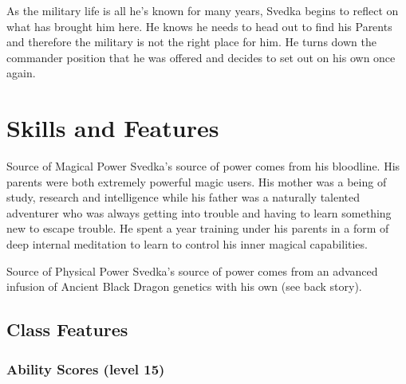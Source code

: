 \documentclass[letterpaper,10pt,twoside,twocolumn,openany]{book}
\begin{document}
As the military life is all he's known for many years, Svedka begins to reflect on what has brought him here. He knows he needs to head out to find his Parents and therefore the military is not the right place for him. He turns down the commander position that he was offered and decides to set out on his own once again.

\twocolumn

\chapter{Skills and Features}

\begin{paperbox}[float=!t]{Source of Magical Power}
	Svedka's source of power comes from his bloodline. His parents were both extremely powerful magic users. His mother was a being of study, research and intelligence while his father was a naturally talented adventurer who was always getting into trouble and having to learn something new to escape trouble. He spent a year training under his parents in a form of deep internal meditation to learn to control his inner magical capabilities.
\end{paperbox}

\begin{paperbox}[float=!t]{Source of Physical Power}
	Svedka's source of power comes from an advanced infusion of Ancient Black Dragon genetics with his own (see back story).
\end{paperbox}

\section{Class Features}

\subsection{Ability Scores (level 15)}
\stats[
STR = \stat{},
DEX = \stat{},
CON = \stat{},
INT = \stat{},
WIS = \stat{},
CHA = \stat{}
]
\end{document}
